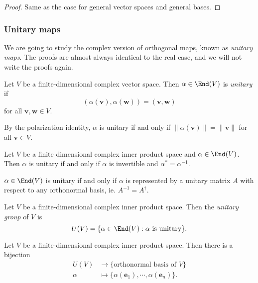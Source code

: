 \documentclass[a4paper]{article}
\begin{document}
\begin{proof}
  Same as the case for general vector spaces and general bases.
\end{proof}

\subsubsection*{Unitary maps}
We are going to study the complex version of orthogonal maps, known as \emph{unitary maps}. The proofs are almost always identical to the real case, and we will not write the proofs again.

\begin{defi}
  Let $V$ be a finite-dimensional complex vector space. Then $\alpha \in \End(V)$ is \emph{unitary} if
  \[
    (\alpha(\mathbf{v}), \alpha(\mathbf{w})) = (\mathbf{v}, \mathbf{w})
  \]
  for all $\mathbf{v}, \mathbf{w} \in V$.
\end{defi}
By the polarization identity, $\alpha$ is unitary if and only if $\|\alpha(\mathbf{v})\| = \|\mathbf{v}\|$ for all $\mathbf{v} \in V$.

\begin{lemma}
  Let $V$ be a finite dimensional complex inner product space and $\alpha \in \End(V)$. Then $\alpha$ is unitary if and only if $\alpha$ is invertible and $\alpha^* = \alpha^{-1}$.
\end{lemma}

\begin{cor}
  $\alpha \in \End(V)$ is unitary if and only if $\alpha$ is represented by a unitary matrix $A$ with respect to any orthonormal basis, ie. $A^{-1} = A^\dagger$.
\end{cor}

\begin{defi}
  Let $V$ be a finite-dimensional complex inner product space. Then the \emph{unitary group} of $V$ is
  \[
    U(V) = \{\alpha \in \End(V): \alpha\text{ is unitary}\}.
  \]
\end{defi}

\begin{prop}
  Let $V$ be a finite-dimensional complex inner product space. Then there is a bijection
  \begin{align*}
    U(V) &\to \{\text{orthonormal basis of } V\}\\
    \alpha &\mapsto \{\alpha(\mathbf{e}_1), \cdots, \alpha (\mathbf{e}_n)\}.
  \end{align*}
\end{prop}
\end{document}
